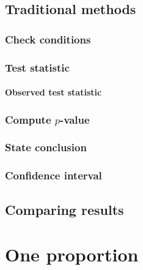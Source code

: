 \documentclass[12pt, krantz2,]{krantz}
\let\oldparagraph\paragraph
\renewcommand{\paragraph}[1]{\oldparagraph{#1}\mbox{}}
\begin{document}
\hypertarget{traditional-methods}{%
\subsection{Traditional methods}\label{traditional-methods}}

\hypertarget{check-conditions}{%
\subsubsection*{Check conditions}\label{check-conditions}}


\hypertarget{test-statistic}{%
\subsubsection*{Test statistic}\label{test-statistic}}


\hypertarget{observed-test-statistic}{%
\paragraph{Observed test statistic}\label{observed-test-statistic}}

\hypertarget{compute-p-value}{%
\subsubsection*{\texorpdfstring{Compute \(p\)-value}{Compute p-value}}\label{compute-p-value}}


\hypertarget{state-conclusion}{%
\subsubsection*{State conclusion}\label{state-conclusion}}


\hypertarget{confidence-interval}{%
\subsubsection*{Confidence interval}\label{confidence-interval}}


\hypertarget{comparing-results}{%
\subsection{Comparing results}\label{comparing-results}}

\hypertarget{one-proportion}{%
\section{One proportion}\label{one-proportion}}
\end{document}
